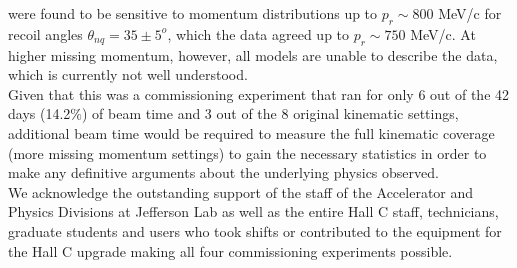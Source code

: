 were found to be sensitive to momentum distributions up to $p_{r}\sim800$ MeV/c for recoil angles $\theta_{nq}=35\pm5^{o}$, which the data agreed
up to $p_{r}\sim750$ MeV/c. At higher missing momentum, however, all models are unable to describe the data, which is currently not well understood.\\
\indent Given that this was a commissioning experiment that ran for only 6 out of the 42 days (14.2$\%$) of beam time and 3 out of the 8 original kinematic settings,
additional beam time would be required to measure the full kinematic coverage (more missing momentum settings) to gain the necessary statistics 
in order to make any definitive arguments about the underlying physics observed. \\
\indent We acknowledge the outstanding support of the staff of the Accelerator and Physics Divisions at Jefferson Lab
as well as the entire Hall C staff, technicians, graduate students and users who took shifts or contributed
to the equipment for the Hall C upgrade making all four commissioning experiments possible. 

